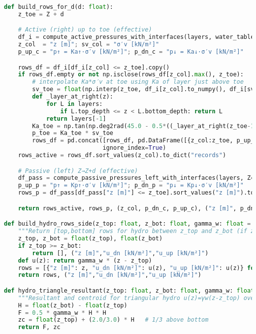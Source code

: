\begin{lstlisting}[language=Python]
def build_rows_for_d(d: float):
    z_toe = Z + d

    # Active (right) up to toe (effective)
    df_i = compute_active_pressures_with_interfaces(layers, water_table_depth=z_wt)
    z_col  = "z [m]"; sv_col = "σ′v [kN/m²]"
    p_up_c = "p↑ = Ka↑·σ′v [kN/m²]"; p_dn_c = "p↓ = Ka↓·σ′v [kN/m²]"

    rows_df = df_i[df_i[z_col] <= z_toe].copy()
    if rows_df.empty or not np.isclose(rows_df[z_col].max(), z_toe):
        # interpolate Ka*σ′v at toe using Ka of layer just above toe
        sv_toe = float(np.interp(z_toe, df_i[z_col].to_numpy(), df_i[sv_col].to_numpy()))
        def _layer_at_right(z):
            for L in layers:
                if L.top_depth <= z < L.bottom_depth: return L
            return layers[-1]
        Ka_toe = np.tan(np.deg2rad(45.0 - 0.5*((_layer_at_right(z_toe-1e-6).params.phi) or 0.0)))**2
        p_toe = Ka_toe * sv_toe
        rows_df = pd.concat([rows_df, pd.DataFrame([{z_col:z_toe, p_up_c:p_toe, p_dn_c:p_toe}])],
                            ignore_index=True)
    rows_active = rows_df.sort_values(z_col).to_dict("records")

    # Passive (left) Z→Z+d (effective)
    df_pass = compute_passive_pressures_left_with_interfaces(layers, Z=Z, t=d, water_table_depth=z_wt)
    p_up_p = "p↑ = Kp↑·σ′v [kN/m²]"; p_dn_p = "p↓ = Kp↓·σ′v [kN/m²]"
    rows_p = df_pass[df_pass["z [m]"] <= z_toe].sort_values("z [m]").to_dict("records")

    return rows_active, rows_p, (z_col, p_dn_c, p_up_c), ("z [m]", p_dn_p, p_up_p), z_toe

def build_hydro_rows_side(z_top: float, z_bot: float, gamma_w: float = 9.81):
    """Return [top,bottom] rows for hydro between z_top and z_bot (if z_top < z_bot)."""
    z_top, z_bot = float(z_top), float(z_bot)
    if z_top >= z_bot:
        return [], ("z [m]","u_dn [kN/m²]","u_up [kN/m²]")
    def u(z): return gamma_w * (z - z_top)
    rows = [{"z [m]": z, "u_dn [kN/m²]": u(z), "u_up [kN/m²]": u(z)} for z in [z_top, z_bot]]
    return rows, ("z [m]","u_dn [kN/m²]","u_up [kN/m²]")

def hydro_triangle_resultant(z_top: float, z_bot: float, gamma_w: float = 9.81):
    """Resultant and centroid for triangular hydro u(z)=γw(z-z_top) over [z_top,z_bot]."""
    H = float(z_bot) - float(z_top)
    F = 0.5 * gamma_w * H * H
    zc = float(z_top) + (2.0/3.0) * H   # 1/3 above bottom
    return F, zc


\end{lstlisting}
